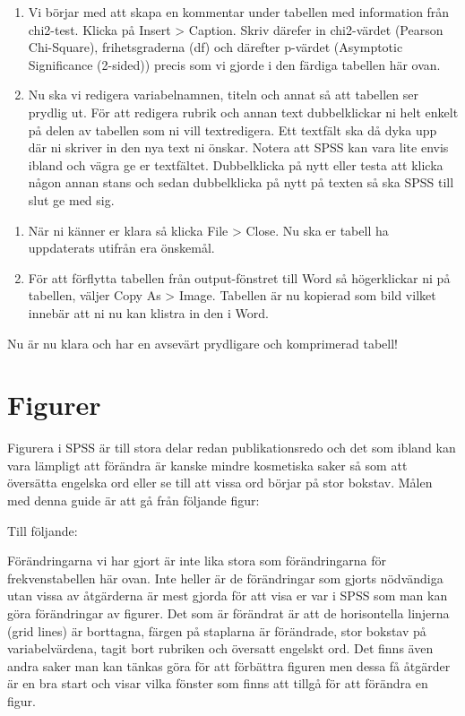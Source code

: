 \documentclass[
]{book}
\begin{document}
\begin{enumerate}
\def\labelenumi{\arabic{enumi}.}
\setcounter{enumi}{5}
\item
  Vi börjar med att skapa en kommentar under tabellen med information från chi2-test. Klicka på Insert \textgreater{} Caption. Skriv därefer in chi2-värdet (Pearson Chi-Square), frihetsgraderna (df) och därefter p-värdet (Asymptotic Significance (2-sided)) precis som vi gjorde i den färdiga tabellen här ovan.
\item
  Nu ska vi redigera variabelnamnen, titeln och annat så att tabellen ser prydlig ut. För att redigera rubrik och annan text dubbelklickar ni helt enkelt på delen av tabellen som ni vill textredigera. Ett textfält ska då dyka upp där ni skriver in den nya text ni önskar. Notera att SPSS kan vara lite envis ibland och vägra ge er textfältet. Dubbelklicka på nytt eller testa att klicka någon annan stans och sedan dubbelklicka på nytt på texten så ska SPSS till slut ge med sig.
\end{enumerate}

\begin{enumerate}
\def\labelenumi{\arabic{enumi}.}
\setcounter{enumi}{7}
\item
  När ni känner er klara så klicka File \textgreater{} Close. Nu ska er tabell ha uppdaterats utifrån era önskemål.
\item
  För att förflytta tabellen från output-fönstret till Word så högerklickar ni på tabellen, väljer Copy As \textgreater{} Image. Tabellen är nu kopierad som bild vilket innebär att ni nu kan klistra in den i Word.
\end{enumerate}

Nu är nu klara och har en avsevärt prydligare och komprimerad tabell!

\hypertarget{figurer}{%
\section{Figurer}\label{figurer}}

Figurera i SPSS är till stora delar redan publikationsredo och det som ibland kan vara lämpligt att förändra är kanske mindre kosmetiska saker så som att översätta engelska ord eller se till att vissa ord börjar på stor bokstav. Målen med denna guide är att gå från följande figur:

Till följande:

Förändringarna vi har gjort är inte lika stora som förändringarna för frekvenstabellen här ovan. Inte heller är de förändringar som gjorts nödvändiga utan vissa av åtgärderna är mest gjorda för att visa er var i SPSS som man kan göra förändringar av figurer. Det som är förändrat är att de horisontella linjerna (grid lines) är borttagna, färgen på staplarna är förändrade, stor bokstav på variabelvärdena, tagit bort rubriken och översatt engelskt ord. Det finns även andra saker man kan tänkas göra för att förbättra figuren men dessa få åtgärder är en bra start och visar vilka fönster som finns att tillgå för att förändra en figur.
\end{document}
